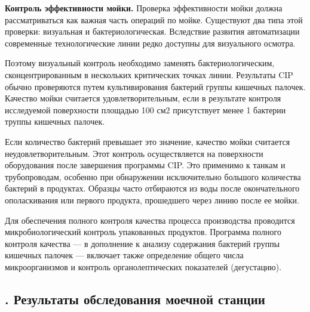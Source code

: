 {\par \redline \textbf{Контроль эффективности мойки.} Проверка эффективности мойки должна рассматриваться как важная часть операций по мойке. Существуют два типа этой проверки: визуальная и бактериологическая. Вследствие развития автоматизации современные технологические линии редко доступны для визуального осмотра.

\par \redline Поэтому визуальный контроль необходимо заменять бактериологическим, сконцентрированным в нескольких критических точках линии. Результаты CIP обычно проверяются путем культивирования бактерий группы кишечных палочек. Качество мойки считается удовлетворительным, если в результате контроля исследуемой поверхности площадью 100 см2 присутствует менее 1 бактерии труппы кишечных палочек.

\par \redline Если количество бактерий превышает это значение, качество мойки считается неудовлетворительным. Этот контроль осуществляется на поверхности оборудования после завершения программы CIP. Это применимо к танкам и трубопроводам, особенно при обнаружении исключительно большого количества бактерий в продуктах. Образцы часто отбираются из воды после окончательного ополаскивания или первого продукта, прошедшего через линию после ее мойки.

\par \redline Для обеспечения полного контроля качества процесса производства проводится микробиологический контроль упакованных продуктов. Программа полного контроля качества — в дополнение к анализу содержания бактерий группы кишечных палочек — включает также определение общего числа микроорганизмов и контроль органолептических показателей (дегустацию).


\par
}

\subtitlespace

\subsection*{ 
  \gostTitleFont
  \redline
  \thechaptercntr .\thesubchaptercntr \spc
  Результаты обследования моечной станции
} \addtocounter{subchaptercntr}{1}

\subtitlespace

